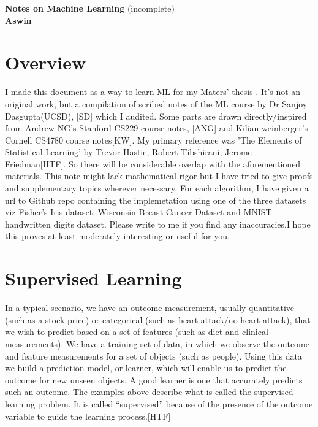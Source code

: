 \documentclass[12pt]{article}
\begin{document}
	
	   
	     
	
		\enlargethispage{2cm}
		
		\begin{center}
			
			\vspace*{-1cm}
			
			\textbf{\Large Notes on Machine Learning     }(incomplete)\\[10pt]
			

\textbf{\Large Aswin}\\ [8pt]			
			
			\end{center}
		
\cleardoublepage

\tableofcontents
\newpage

\section{Overview}

I made this document as a way to learn ML for my Maters' thesis . It’s not an original work, but a compilation of scribed notes of the ML course by Dr Sanjoy Dasgupta(UCSD), [SD] which I audited. Some parts are drawn directly/inspired from Andrew NG's Stanford CS229 course notes, [ANG] and Kilian weinberger's Cornell CS4780 course notes[KW]. My primary reference was 'The Elements of Statistical Learning' by Trevor Hastie, Robert Tibshirani, Jerome Friedman[HTF]. So there will be considerable overlap with the aforementioned materials. This note might lack mathematical rigor but I have tried to give proofs and supplementary topics wherever necessary. For each algorithm, I have given a url to Github repo containing the implemetation using one of the three datasets viz Fisher's Iris dataset, Wisconsin Breast Cancer Dataset and MNIST handwritten digits dataset.
Please write to me if you find any inaccuracies.I hope this   proves at least moderately
interesting or useful for you.

\cleardoublepage

\section{Supervised Learning}

	In a typical scenario, we have an outcome measurement, usually quantitative (such as a stock price) or
categorical (such as heart attack/no heart attack), that we wish to predict
based on a set of features (such as diet and clinical measurements). We
have a training set of data, in which we observe the outcome and feature
measurements for a set of objects (such as people). Using this data we build
a prediction model, or learner, which will enable us to predict the outcome
for new unseen objects. A good learner is one that accurately predicts such
an outcome.
The examples above describe what is called the supervised learning problem. It is called “supervised” because of the presence of the outcome variable to guide the learning process.[HTF]
\end{document}
